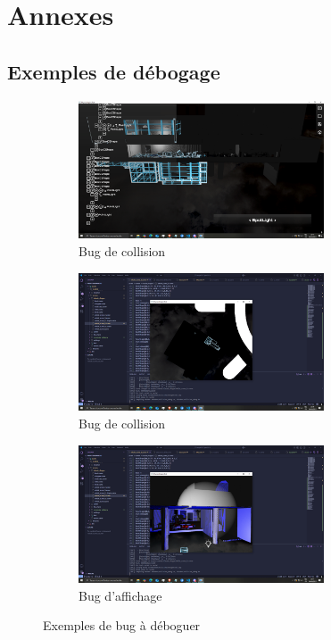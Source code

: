 \newpage
\section{Annexes}
\subsection{Exemples de débogage}

\begin{figure}[H]
    \begin{subfigure}{0.5\textwidth}
        \centering
        \includegraphics[width=0.8\textwidth]{images/gdb_editeur.png}
        \caption{Bug de collision}
        \label{fig:editeur1}
    \end{subfigure}
    \begin{subfigure}{0.5\textwidth}
        \centering
        \includegraphics[width=0.8\textwidth]{images/gdb_editeur2.png}
        \caption{Bug de collision}
        \label{fig:editeur2}
    \end{subfigure}
    \begin{subfigure}{0.5\textwidth}
        \centering
        \includegraphics[width=0.8\textwidth]{images/gdb_editeur3.png}
        \caption{Bug d'affichage}
        \label{fig:editeur3}
    \end{subfigure}
    \caption{Exemples de bug à déboguer}
    \label{fig:debug}
\end{figure}

